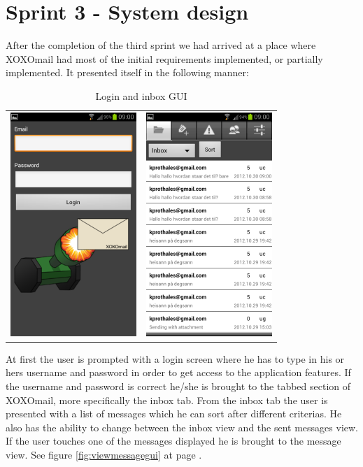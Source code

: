 \section{Sprint 3 - System design}
After the completion of the third sprint we had arrived at a place where XOXOmail had most of the initial requirements implemented, or partially implemented. It presented itself in the following manner:
\newline
\newline
\begin{table}[h!]
\begin{center}
\begin{tabular}{cc}
\includegraphics{logingui} & \includegraphics{inbox}
\end{tabular}
\end{center}
\caption{Login and inbox GUI} \label{tab:logininboxgui}
\end{table}

At first the user is prompted with a login screen where he has to type in his or hers username and password in order to get access to the application features. If the username and password is correct he/she is brought to the tabbed section of XOXOmail, more specifically the inbox tab. From the inbox tab the user is presented with a list of messages which he can sort after different criterias. He also has the ability to change between the inbox view and the sent messages view. If the user touches one of the messages displayed he is brought to the message view. See figure \ref{fig:viewmessagegui} at page \pageref{fig:viewmessagegui}.
\newline

